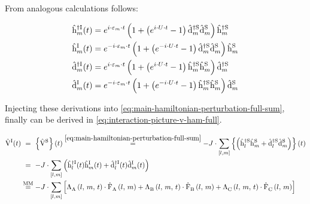 From analogous calculations follows:

\begin{equation*}
    \begin{split}
        \hopOfT[\interactionPicture]{m}{\dagger}  &= e^{i \cdot \epsl[m]\cdot  t}\left(1 + \left(e^{i  \cdot U  \cdot  t}-1\right) \dop[\schroedingerPicture]{m}{\dagger}\dop[\schroedingerPicture]{m}{}\right)  \hop[\schroedingerPicture]{m}{\dagger}\\
        \hopOfT[\interactionPicture]{m}{}  &= e^{-i \cdot \epsl[m]\cdot  t}\left(1 + \left(e^{-i  \cdot U  \cdot  t}-1\right) \dop[\schroedingerPicture]{m}{\dagger}\dop[\schroedingerPicture]{m}{}\right)  \hop[\schroedingerPicture]{m}{}\\
        \dopOfT[\interactionPicture]{m}{\dagger}  &= e^{i \cdot \epsl[m]\cdot  t}\left(1 + \left(e^{i  \cdot U  \cdot  t}-1\right) \hop[\schroedingerPicture]{m}{\dagger}\hop[\schroedingerPicture]{m}{}\right)  \dop[\schroedingerPicture]{m}{\dagger}\\
        \dopOfT[\interactionPicture]{m}{}  &= e^{-i \cdot \epsl[m]\cdot  t}\left(1 + \left(e^{-i  \cdot U  \cdot  t}-1\right) \hop[\schroedingerPicture]{m}{\dagger}\hop[\schroedingerPicture]{m}{}\right)  \dop[\schroedingerPicture]{m}{}\\
    \end{split}
\end{equation*}

Injecting these derivations into \autoref{eq:main-hamiltonian-perturbation-full-sum}, finally \VhamiltonianOfT[\interactionPicture] can be derived in \autoref{eq:interaction-picture-v-ham-full}.

\begin{equation}
    \label{eq:interaction-picture-v-ham-full}
    \begin{split}
        \VhamiltonianOfT[\interactionPicture] &
        \stackrel{\phantom{\text{MM}}}{=}
        \left\{\Vhamiltonian[\schroedingerPicture]\right\}(t) \stackrel{\ref{eq:main-hamiltonian-perturbation-full-sum}}{=}
        - J \cdot \fullneighborsum{l}{m}  \left\{
              \left(\hop[\schroedingerPicture]{l}{\dagger}\hop[\schroedingerPicture]{m}{} + \dop[\schroedingerPicture]{l}{\dagger}\dop[\schroedingerPicture]{m}{} \right)
        \right\}(t) \\
        &\stackrel{\phantom{\text{MM}}}{=}
        -J \cdot \fullneighborsum{l}{m}\left(\hopOfT[\interactionPicture]{l}{\dagger}\hopOfT[\interactionPicture]{m}{} + \dopOfT[\interactionPicture]{l}{\dagger}\dopOfT[\interactionPicture]{m}{} \right)\\
        &\stackrel{\text{MM}}{=}
        -J \cdot \fullneighborsum{l}{m} \left[
            \VhamiltonianAnalyticalPart{A}{l}{m}{t} \cdot \VhamiltonianOperatorPart{A}{l}{m} + 
            \VhamiltonianAnalyticalPart{B}{l}{m}{t} \cdot \VhamiltonianOperatorPart{B}{l}{m} + 
            \VhamiltonianAnalyticalPart{C}{l}{m}{t} \cdot \VhamiltonianOperatorPart{C}{l}{m} 
        \right]
    \end{split}
\end{equation}

